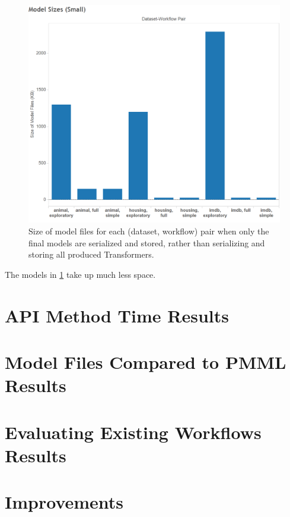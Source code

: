 \begin{figure}
  \centering
  \includegraphics[width=5.0in]{modelsizes_small}
  \caption{
    Size of model files for each (dataset, workflow) pair when only the final models are serialized
    and stored, rather than serializing and storing all produced Transformers.
  }
  \label{fig:modelsizes_small}
\end{figure}

The models in \ref{fig:modelsizes_small} take up much less space.

\section{API Method Time Results}

\section{Model Files Compared to PMML Results}

\section{Evaluating Existing Workflows Results}

\section{Improvements}
